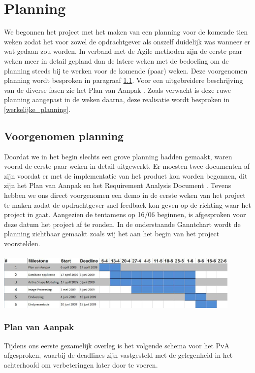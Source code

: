 \section{Planning}
\label{Planning}
We begonnen het project met het maken van een planning voor de komende tien
weken zodat het voor zowel de opdrachtgever als onszelf duidelijk was wanneer
er wat gedaan zou worden. In verband met de Agile methoden zijn de eerste paar
weken meer in detail gepland dan de latere weken met de bedoeling om de
planning steeds bij te werken voor de komende (paar) weken. Deze voorgenomen
planning wordt besproken in paragraaf \ref{voorgenomen_planning}. Voor een
uitgebreidere beschrijving van de diverse fasen zie het Plan van Aanpak \pageref{PvA}. 
Zoals verwacht is deze ruwe planning aangepast in de
weken daarna, deze realisatie wordt besproken in \ref{werkelijke_planning}.

\subsection{Voorgenomen planning}
\label{voorgenomen_planning}
Doordat we in het begin slechts een grove planning hadden gemaakt, waren vooral
de eerste paar weken in detail uitgewerkt. Er moesten twee documenten af zijn
voordat er met de implementatie van het product kon worden begonnen, dit zijn
het Plan van Aanpak \pageref{PvA} en het Requirement Analysis Document \pageref{RAD}. Tevens
hebben we ons direct voorgenomen een demo in de eerste weken van het project te
maken zodat de opdrachtgever snel feedback kon geven op de richting waar het
project in gaat.
Aangezien de tentamens op 16/06 beginnen, is afgesproken
voor deze datum het project af te ronden. In de onderstaande Ganntchart wordt
de planning zichtbaar gemaakt zoals wij het aan het begin van het project
voorstelden.
\\
\\
\includegraphics[width=0.9\textwidth]{ganntbefore}

\subsubsection{Plan van Aanpak}
Tijdens ons eerste gezamelijk overleg is het volgende schema voor het PvA
afgesproken, waarbij de deadlines zijn vastgesteld met de gelegenheid in het achterhoofd om 
verbeteringen later door te voeren.

